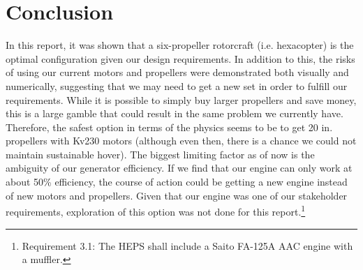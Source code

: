 \documentclass{article}
\begin{document}
\section{Conclusion}\label{sec:conclusion}
In this report, it was shown that a six-propeller rotorcraft (i.e. hexacopter) is the optimal configuration given our design requirements. In addition to this, the risks of using our current motors and propellers were demonstrated both visually and numerically, suggesting that we may need to get a new set in order to fulfill our requirements. While it is possible to simply buy larger propellers and save money, this is a large gamble that could result in the same problem we currently have. Therefore, the safest option in terms of the physics seems to be to get 20 in. propellers with Kv230 motors (although even then, there is a chance we could not maintain sustainable hover). The biggest limiting factor as of now is the ambiguity of our generator efficiency. If we find that our engine can only work at about 50\% efficiency, the course of action could be getting a new engine instead of new motors and propellers. Given that our engine was one of our stakeholder requirements, exploration of this option was not done for this report.\footnote{Requirement 3.1: The HEPS shall include a Saito FA-125A AAC engine with a muffler.}
\end{document}

